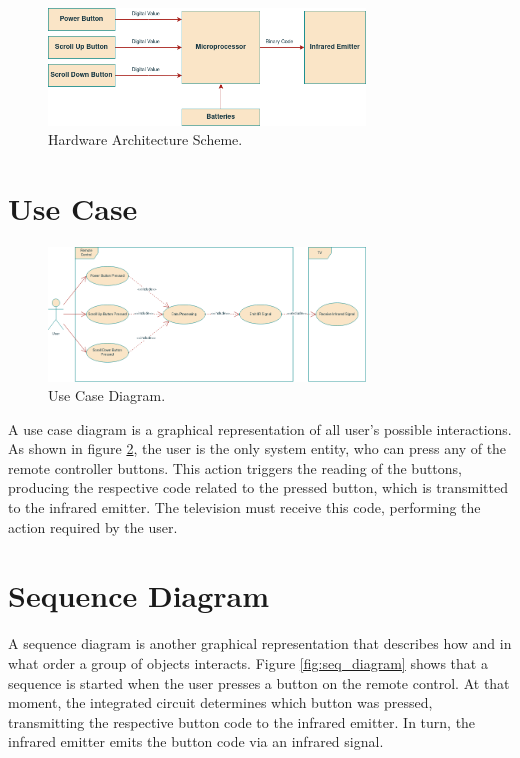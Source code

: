 \documentclass[12pt, letterpaper]{report}
\begin{document}
\begin{figure}[ht]
	\centering
	\includegraphics[width=0.75\textwidth]{HW_Arch}
	\caption{Hardware Architecture Scheme.}
	\label{fig:hw_arch}
\end{figure}


\section{Use Case}

\begin{figure}[ht]
	\centering
	\includegraphics[width=0.75\textwidth]{Use-Case}
	\caption{Use Case Diagram.}
	\label{fig:use_case}
\end{figure}

A use case diagram is a graphical representation of all user’s possible interactions. As shown in figure \ref{fig:use_case}, the user is the only system entity, who can press any of the remote controller buttons. This action triggers the reading of the buttons, producing the respective code related to the pressed button, which is transmitted to the infrared emitter. The television must receive this code, performing the action required by the user.

\section{Sequence Diagram}
A sequence diagram is another graphical representation that describes how and in what order a group of objects interacts. Figure \ref{fig:seq_diagram} shows that a sequence is started when the user presses a button on the remote control. At that moment, the integrated circuit determines which button was pressed, transmitting the respective button code to the infrared emitter. In turn, the infrared emitter emits the button code via an infrared signal.
\end{document}
